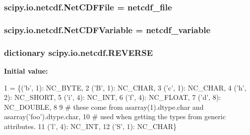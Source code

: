 \subsubsection[{Net\+C\+D\+F\+File}]{\setlength{\rightskip}{0pt plus 5cm}scipy.\+io.\+netcdf.\+Net\+C\+D\+F\+File = {\bf netcdf\+\_\+file}}\label{namespacescipy_1_1io_1_1netcdf_ab85e2f87cc58c0462d526739f327e2ed}
\hypertarget{namespacescipy_1_1io_1_1netcdf_a781bd7b55c877c1a3251544ef7c79cb4}{}
\subsubsection[{Net\+C\+D\+F\+Variable}]{\setlength{\rightskip}{0pt plus 5cm}scipy.\+io.\+netcdf.\+Net\+C\+D\+F\+Variable = {\bf netcdf\+\_\+variable}}\label{namespacescipy_1_1io_1_1netcdf_a781bd7b55c877c1a3251544ef7c79cb4}
\hypertarget{namespacescipy_1_1io_1_1netcdf_a48d72c5076909026c28d1351b344d7bb}{}
\subsubsection[{R\+E\+V\+E\+R\+S\+E}]{\setlength{\rightskip}{0pt plus 5cm}dictionary scipy.\+io.\+netcdf.\+R\+E\+V\+E\+R\+S\+E}\label{namespacescipy_1_1io_1_1netcdf_a48d72c5076909026c28d1351b344d7bb}
{\bfseries Initial value\+:}
\begin{DoxyCode}
1 = \{(\textcolor{stringliteral}{'b'}, 1): NC\_BYTE,
2             (\textcolor{stringliteral}{'B'}, 1): NC\_CHAR,
3             (\textcolor{stringliteral}{'c'}, 1): NC\_CHAR,
4             (\textcolor{stringliteral}{'h'}, 2): NC\_SHORT,
5             (\textcolor{stringliteral}{'i'}, 4): NC\_INT,
6             (\textcolor{stringliteral}{'f'}, 4): NC\_FLOAT,
7             (\textcolor{stringliteral}{'d'}, 8): NC\_DOUBLE,
8 
9             \textcolor{comment}{# these come from asarray(1).dtype.char and asarray('foo').dtype.char,}
10             \textcolor{comment}{# used when getting the types from generic attributes.}
11             (\textcolor{stringliteral}{'l'}, 4): NC\_INT,
12             (\textcolor{stringliteral}{'S'}, 1): NC\_CHAR\}
\end{DoxyCode}
\hypertarget{namespacescipy_1_1io_1_1netcdf_a727ae029662cc9c04ad0fb7e01ac5947}{}
